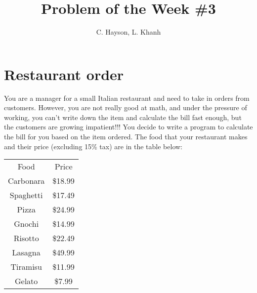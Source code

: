 \documentclass[12pt]{article}
\title{\textbf{Problem of the Week \#3}}
\author{C. Hayson, L. Khanh}
\begin{document}
\maketitle
\section*{Restaurant order}
You are a manager for a small Italian restaurant and need to take in orders from customers. However, you are not really good at math, and under the pressure of working, you can't write down the item and calculate the bill fast enough, but the customers are growing impatient!!! You decide to write a program to calculate the bill for you based on the item ordered. The food that your restaurant makes and their price (excluding 15\% tax) are in the table below:

\begin{table}[h!]
    \centering
    \begin{tabular}{c|c}
        Food & Price \\
        \hhline{|=|=|}
        Carbonara & \$18.99 \\
        Spaghetti & \$17.49 \\
        Pizza & \$24.99 \\
        Gnochi & \$14.99 \\
        Risotto & \$22.49 \\
        Lasagna & \$49.99 \\
        Tiramisu & \$11.99 \\
        Gelato & \$7.99
    \end{tabular}
\end{table}
\end{document}
